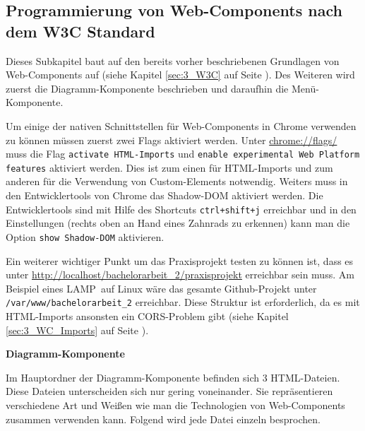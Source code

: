 \subsection{Programmierung von Web-Components nach dem W3C Standard}
\label{sec:4_WC_Pur}

Dieses Subkapitel baut auf den bereits vorher beschriebenen Grundlagen von Web-Components auf (siehe Kapitel \ref{sec:3_W3C} auf Seite \pageref{sec:3_W3C}). Des Weiteren wird zuerst die Diagramm-Komponente beschrieben und daraufhin die Menü-Komponente.

Um einige der nativen Schnittstellen für Web-Components in Chrome verwenden zu können müssen zuerst zwei Flags aktiviert werden. Unter \url{chrome://flags/} muss die Flag \lstinline|activate HTML-Imports| und \lstinline|enable experimental Web Platform features| aktiviert werden. Dies ist zum einen für HTML-Imports und zum anderen für die Verwendung von Custom-Elements notwendig. Weiters muss in den Entwicklertools von Chrome das Shadow-DOM aktiviert werden. Die Entwicklertools sind mit Hilfe des Shortcuts \lstinline|ctrl+shift+j| erreichbar und in den Einstellungen (rechts oben an Hand eines Zahnrads zu erkennen) kann man die Option \lstinline|show Shadow-DOM| aktivieren.

Ein weiterer wichtiger Punkt um das Praxisprojekt testen zu können ist, dass es unter \url{http://localhost/bachelorarbeit_2/praxisprojekt} erreichbar sein muss. Am Beispiel eines \glqq LAMP\grqq\ auf Linux wäre das gesamte Github-Projekt unter \lstinline|/var/www/bachelorarbeit_2| erreichbar. Diese Struktur ist erforderlich, da es mit HTML-Imports ansonsten ein CORS-Problem gibt (siehe Kapitel \ref{sec:3_WC_Imports} auf Seite \pageref{sec:3_WC_Imports}).


\textbf{Diagramm-Komponente}

Im Hauptordner der Diagramm-Komponente befinden sich 3 HTML-Dateien. Diese Dateien unterscheiden sich nur gering voneinander. Sie repräsentieren verschiedene Art und Weißen wie man die Technologien von Web-Components zusammen verwenden kann. Folgend wird jede Datei einzeln besprochen.

